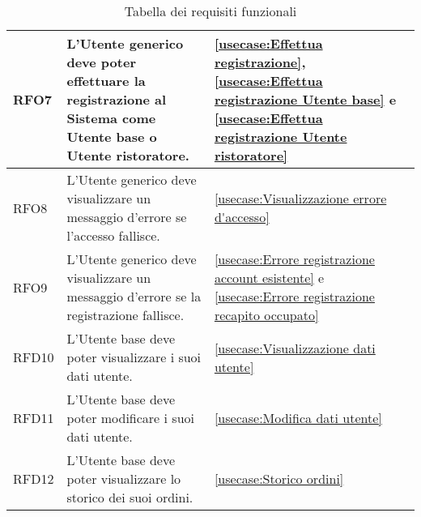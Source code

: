 \begin{table}[H]
\begin{tabularx}{\textwidth}{l|X|p{2cm}}
		\hline
		RFO7        & L'Utente generico deve poter effettuare la registrazione al Sistema come Utente base o Utente ristoratore. & \autoref{usecase:Effettua registrazione}, \autoref{usecase:Effettua registrazione Utente base} e \autoref{usecase:Effettua registrazione Utente ristoratore} \\
		\hline
		RFO8        & L'Utente generico deve visualizzare un messaggio d'errore se l'accesso fallisce.                           & \autoref{usecase:Visualizzazione errore d'accesso}                                                                                                           \\
		\hline
		RFO9        & L'Utente generico deve visualizzare un messaggio d'errore se la registrazione fallisce.                    & \autoref{usecase:Errore registrazione account esistente} e \autoref{usecase:Errore registrazione recapito occupato}                                          \\
		\hline
		RFD10       & L'Utente base deve poter visualizzare i suoi dati utente.                                                  & \autoref{usecase:Visualizzazione dati utente}                                                                                                                \\
		\hline
		RFD11       & L'Utente base deve poter modificare i suoi dati utente.                                                    & \autoref{usecase:Modifica dati utente}                                                                                                                       \\
		\hline
		RFD12       & L'Utente base deve poter visualizzare lo storico dei suoi ordini.                                          & \autoref{usecase:Storico ordini}                                                                                                                             \\
	\end{tabularx}
	\caption{Tabella dei requisiti funzionali}
\end{table}

